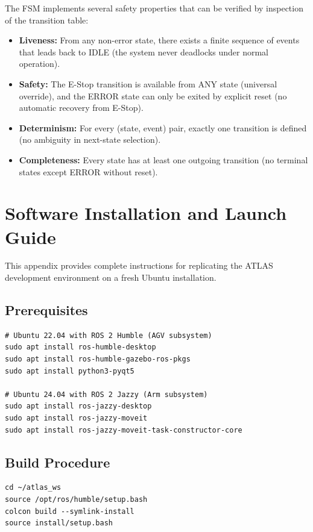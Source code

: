 \documentclass[12pt,a4paper,oneside]{report}
\begin{document}
The FSM implements several safety properties that can be verified by inspection of the transition table:
\begin{itemize}
\item \textbf{Liveness:} From any non-error state, there exists a finite sequence of events that leads back to IDLE (the system never deadlocks under normal operation).
\item \textbf{Safety:} The E-Stop transition is available from ANY state (universal override), and the ERROR state can only be exited by explicit reset (no automatic recovery from E-Stop).
\item \textbf{Determinism:} For every (state, event) pair, exactly one transition is defined (no ambiguity in next-state selection).
\item \textbf{Completeness:} Every state has at least one outgoing transition (no terminal states except ERROR without reset).
\end{itemize}


\chapter{Software Installation and Launch Guide}

This appendix provides complete instructions for replicating the ATLAS development environment on a fresh Ubuntu installation.

\section*{Prerequisites}

\begin{verbatim}
# Ubuntu 22.04 with ROS 2 Humble (AGV subsystem)
sudo apt install ros-humble-desktop
sudo apt install ros-humble-gazebo-ros-pkgs
sudo apt install python3-pyqt5

# Ubuntu 24.04 with ROS 2 Jazzy (Arm subsystem)
sudo apt install ros-jazzy-desktop
sudo apt install ros-jazzy-moveit
sudo apt install ros-jazzy-moveit-task-constructor-core
\end{verbatim}

\section*{Build Procedure}

\begin{verbatim}
cd ~/atlas_ws
source /opt/ros/humble/setup.bash
colcon build --symlink-install
source install/setup.bash
\end{verbatim}
\end{document}
